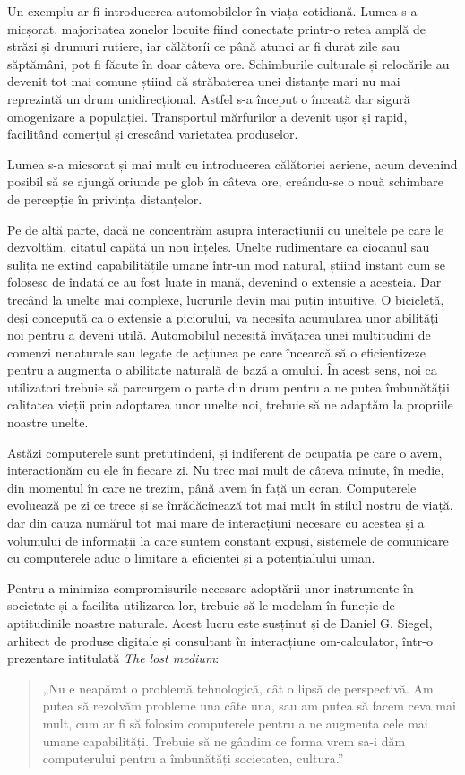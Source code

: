 Un exemplu ar fi introducerea automobilelor în viața cotidiană. Lumea s-a micșorat, majoritatea zonelor locuite fiind conectate printr-o rețea amplă de străzi și drumuri rutiere, iar călătoríi ce până atunci ar fi durat zile sau săptămâni, pot fi făcute în doar câteva ore.
Schimburile culturale și relocările au devenit tot mai comune știind că străbaterea unei distanțe mari nu mai reprezintă un drum unidirecțional. Astfel s-a început o înceată dar sigură omogenizare a populației.
Transportul mărfurilor a devenit ușor și rapid, facilitând comerțul și crescând varietatea produselor.

Lumea s-a micșorat și mai mult cu introducerea călătoriei aeriene, acum devenind posibil să se ajungă oriunde pe glob în câteva ore, creându-se o nouă schimbare de percepție în privința distanțelor.

Pe de altă parte, dacă ne concentrăm asupra interacțiunii cu uneltele pe care le dezvoltăm, citatul capătă un nou înțeles.
Unelte rudimentare ca ciocanul sau sulița ne extind capabilitățile umane într-un mod natural, știind instant cum se folosesc de îndată ce au fost luate in mană, devenind o extensie a acesteia.
Dar trecând la unelte mai complexe, lucrurile devin mai puțin intuitive. O bicicletă, deși concepută ca o extensie a piciorului, va necesita acumularea unor abilități noi pentru a deveni utilă. Automobilul necesită învățarea unei multitudini de comenzi nenaturale sau legate de acțiunea pe care încearcă să o eficientizeze pentru a augmenta o abilitate naturală de bază a omului. În acest sens, noi ca utilizatori trebuie să parcurgem o parte din drum pentru a ne putea îmbunătății calitatea vieții prin adoptarea unor unelte noi, trebuie să ne adaptăm la propriile noastre unelte.

Astăzi computerele sunt pretutindeni, și indiferent de ocupația pe care o avem, interacționăm cu ele în fiecare zi. Nu trec mai mult de câteva minute, în medie, din momentul în care ne trezim, până avem în față un ecran.
Computerele evoluează pe zi ce trece și se înrădăcinează tot mai mult în stilul nostru de viață, dar din cauza numărul tot mai mare de interacțiuni necesare cu acestea și a volumului de informații la care suntem constant expuși, sistemele de comunicare cu computerele aduc o limitare a eficienței și a potențialului uman.

Pentru a minimiza compromisurile necesare adoptării unor instrumente în societate și a facilita utilizarea lor, trebuie să le modelam în funcție de aptitudinile noastre naturale.
Acest lucru este susținut și de Daniel G. Siegel, arhitect de produse digitale și consultant în interacțiune om-calculator, într-o prezentare intitulată \textit{The lost medium}: 
\begin{quotation}
„Nu e neapărat o problemă tehnologică, cât o lipsă de perspectivă. Am putea să rezolvăm probleme una câte una, sau am putea să facem ceva mai mult, cum ar fi să folosim computerele pentru a ne augmenta cele mai umane capabilități.
Trebuie să ne gândim ce forma vrem sa-i dăm computerului pentru a îmbunătăți societatea, cultura.”
\end{quotation}
